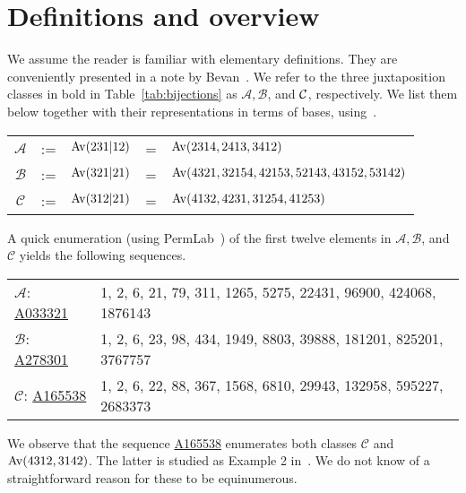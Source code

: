 \documentclass[12pt, a4paper, twoside]{report}
\begin{document}
\section{Definitions and overview}
\label{sec:catalanjuxt_defs}
We assume the reader is familiar with elementary definitions. They are conveniently presented in a note by Bevan~\cite{bevan2015defs}.  We refer to the three juxtaposition classes in bold in Table~\ref{tab:bijections} as $\mathcal{A}, \mathcal{B}$, and $\mathcal{C}$, respectively. We list them below together with their representations in terms of bases, using~\cite{atkinson1997restricted}.

\begin{center}
\begin{tabular}{c c c c l}
$\mathcal{A}$&:= & $\mathrm{Av}(231|12)$ & = & $\mathrm{Av}(2314, 2413, 3412)$ \\
$\mathcal{B}$&:= & $\mathrm{Av}(321|21)$ & = & $\mathrm{Av}(4321, 32154, 42153, 52143, 43152, 53142)$ \\
$\mathcal{C}$&:= & $\mathrm{Av}(312|21)$ & = & $\mathrm{Av}(4132, 4231, 31254, 41253)$\\  %
\end{tabular}
\end{center}

\noindent A quick enumeration (using PermLab~\cite{albertpermlab}) of the first twelve elements in $\mathcal{A}, \mathcal{B}$, and $\mathcal{C}$ yields the following sequences.

\begin{center}
\begin{tabular}{l l}
$\mathcal{A}$: \href{http://oeis.org/A033321}{A033321}& 1, 2, 6, 21, 79, 311, 1265, 5275, 22431, 96900, 424068, 1876143\\
$\mathcal{B}$: \href{http://oeis.org/A278301}{A278301}& 1, 2, 6, 23, 98, 434, 1949, 8803, 39888, 181201, 825201, 3767757\\
$\mathcal{C}$: \href{http://oeis.org/A165538}{A165538}& 1, 2, 6, 22, 88, 367, 1568, 6810, 29943, 132958, 595227, 2683373\\
\end{tabular}
\end{center}
We observe that the sequence \href{http://oeis.org/A165538}{A165538} enumerates both classes $\mathcal{C}$ and $\mathrm{Av}(4312, 3142)$. The latter is studied as Example 2 in~\cite{albert2012inflations}. We do not know of a straightforward reason for these to be equinumerous.
\end{document}
